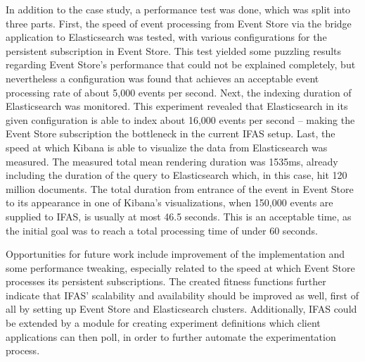 In addition to the case study, a performance test was done, which was split into three parts.
First, the speed of event processing from Event Store via the bridge application to Elasticsearch was tested, with various configurations for the persistent subscription in Event Store.
This test yielded some puzzling results regarding Event Store's performance that could not be explained completely, but nevertheless a configuration was found that achieves an acceptable event processing rate of about 5,000 events per second.
Next, the indexing duration of Elasticsearch was monitored.
This experiment revealed that Elasticsearch in its given configuration is able to index about 16,000 events per second -- making the Event Store subscription the bottleneck in the current \ac{IFAS} setup.
Last, the speed at which Kibana is able to visualize the data from Elasticsearch was measured.
The measured total mean rendering duration was 1535ms, already including the duration of the query to Elasticsearch which, in this case, hit 120 million documents.
The total duration from entrance of the event in Event Store to its appearance in one of Kibana's visualizations, when 150,000 events are supplied to \ac{IFAS}, is usually at most 46.5 seconds.
This is an acceptable time, as the initial goal was to reach a total processing time of under 60 seconds.

Opportunities for future work include improvement of the implementation and some performance tweaking, especially related to the speed at which Event Store processes its persistent subscriptions.
The created fitness functions further indicate that \ac{IFAS}' scalability and availability should be improved as well, first of all by setting up Event Store and Elasticsearch clusters.
Additionally, \ac{IFAS} could be extended by a module for creating experiment definitions which client applications can then poll, in order to further automate the experimentation process.
